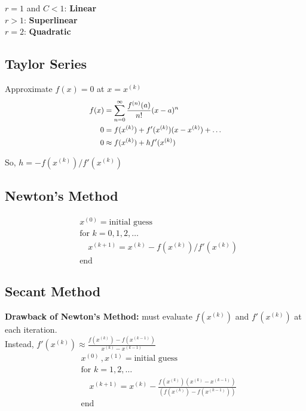 \documentclass[9pt]{article}
\begin{document}
\begin{multicols}{3}
$r=1$ and $C<1$: \textbf{Linear}\\
$r>1$: \textbf{Superlinear}\\
$r=2$: \textbf{Quadratic}

\hdashrule{\linewidth}{0.5pt}{1mm 1mm}
\vspace{-0.7cm}
\subsection*{Taylor Series}
Approximate $f(x) = 0$ at $x = x^{(k)}$
\[
\scalebox{0.9}{$
\begin{aligned}
f(x) &= \sum_{n=0}^\infty \frac{f^{(n)}(a)}{n!} (x-a)^n\\
0 &= f(x^{(k)}) + f'(x^{(k)})(x - x^{(k)}) + \ldots\\ 
0 &\approx f(x^{(k)}) + hf'(x^{(k)})\\
\end{aligned}
$}
\]

So, $h = -f(x^{(k)})/f'(x^{(k)})$

\hdashrule{\linewidth}{0.5pt}{1mm 1mm}
\vspace{-0.7cm}
\subsection*{Newton's Method}
\[
\boxed{
\begin{aligned}
    &x^{(0)} = \text{initial guess}\\
    &\text{for } k = 0, 1, 2, \ldots \\
    & \quad x^{(k+1)} = x^{(k)} - f(x^{(k)})/f'(x^{(k)})\\
    &\text{end}
\end{aligned}
}
\]

\columnbreak
\subsection*{Secant Method}
\textbf{Drawback of Newton's Method: } must evaluate $f(x^{(k)})$ and $f'(x^{(k)})$ at each iteration.\\

Instead, $
f'(x^{(k)}) \approx \frac{f\left( x^{(k)} \right) - f\left( x^{(k-1)} \right)}{x^{(k)} - x^{(k-1)}}
$
\[
\boxed{
\begin{aligned}
    &x^{(0)} \, , x^{(1)} = \text{initial guess}\\
    &\text{for } k = 1, 2, \ldots \\
    & \quad x^{(k+1)} = x^{(k)} - \frac{f(x^{(k)})( x^{(k)} - x^{(k-1)} )}{( f( x^{(k)}) - f( x^{(k-1)}))}\\
    &\text{end}
\end{aligned}
}
\]


\end{multicols}
\end{document}

